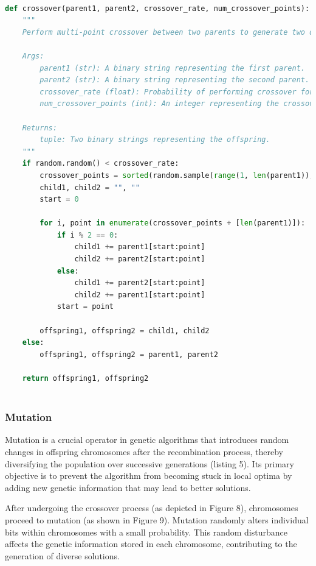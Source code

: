 \documentclass[12pt]{article}
\begin{document}
\newpage


\begin{lstlisting}[language=Python, caption={multi-point crossover}, numbers=none, breaklines=true]

def crossover(parent1, parent2, crossover_rate, num_crossover_points):
    """
    Perform multi-point crossover between two parents to generate two offspring.

    Args:
        parent1 (str): A binary string representing the first parent.
        parent2 (str): A binary string representing the second parent.
        crossover_rate (float): Probability of performing crossover for the chromosome.
        num_crossover_points (int): An integer representing the crossover points for the chromosome.

    Returns:
        tuple: Two binary strings representing the offspring.
    """
    if random.random() < crossover_rate:
        crossover_points = sorted(random.sample(range(1, len(parent1)), num_crossover_points))
        child1, child2 = "", ""
        start = 0

        for i, point in enumerate(crossover_points + [len(parent1)]):
            if i % 2 == 0:
                child1 += parent1[start:point]
                child2 += parent2[start:point]
            else:
                child1 += parent2[start:point]
                child2 += parent1[start:point]
            start = point

        offspring1, offspring2 = child1, child2
    else:
        offspring1, offspring2 = parent1, parent2

    return offspring1, offspring2
    
\end{lstlisting}








\subsubsection{Mutation}

Mutation is a crucial operator in genetic algorithms that introduces random changes in offspring chromosomes after the recombination process, thereby diversifying the population over successive generations (listing 5). Its primary objective is to prevent the algorithm from becoming stuck in local optima by adding new genetic information that may lead to better solutions.

After undergoing the crossover process (as depicted in Figure 8), chromosomes proceed to mutation (as shown in Figure 9). Mutation randomly alters individual bits within chromosomes with a small probability. This random disturbance affects the genetic information stored in each chromosome, contributing to the generation of diverse solutions.
\end{document}
